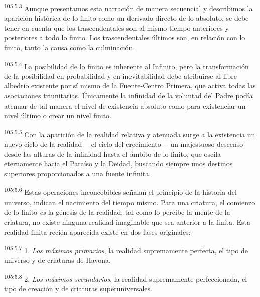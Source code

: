 \par
\textsuperscript{105:5.3} Aunque presentamos esta narración de manera secuencial y describimos la aparición histórica de lo finito como un derivado directo de lo absoluto, se debe tener en cuenta que los trascendentales son al mismo tiempo anteriores y posteriores a todo lo finito. Los trascendentales últimos son, en relación con lo finito, tanto la causa como la culminación.

\par
\textsuperscript{105:5.4} La posibilidad de lo finito es inherente al Infinito, pero la transformación de la posibilidad en probabilidad y en inevitabilidad debe atribuirse al libre albedrío existente por sí mismo de la Fuente-Centro Primera, que activa todas las asociaciones triunitarias. Únicamente la infinidad de la voluntad del Padre podía atenuar de tal manera el nivel de existencia absoluto como para existenciar un nivel último o crear un nivel finito.

\par
\textsuperscript{105:5.5} Con la aparición de la realidad relativa y atenuada surge a la existencia un nuevo ciclo de la realidad ---el ciclo del crecimiento--- un majestuoso descenso desde las alturas de la infinidad hasta el ámbito de lo finito, que oscila eternamente hacia el Paraíso y la Deidad, buscando siempre unos destinos superiores proporcionados a una fuente infinita.

\par
\textsuperscript{105:5.6} Estas operaciones inconcebibles señalan el principio de la historia del universo, indican el nacimiento del tiempo mismo. Para una criatura, el comienzo de lo finito \textit{es} la génesis de la realidad; tal como lo percibe la mente de la criatura, no existe ninguna realidad imaginable que sea anterior a la finita. Esta realidad finita recién aparecida existe en dos fases originales:

\par
\textsuperscript{105:5.7} 1. \textit{Los máximos primarios}, la realidad supremamente perfecta, el tipo de universo y de criaturas de Havona.

\par
\textsuperscript{105:5.8} 2. \textit{Los máximos secundarios}, la realidad supremamente perfeccionada, el tipo de creación y de criaturas superuniversales.

